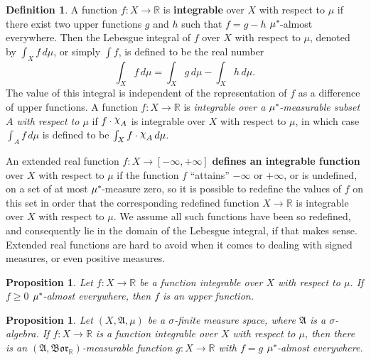 \documentclass[
twoside=true,
paper=letter,
fontsize=11pt,
pagesize=auto,
leqno,
openany,
headsepline,
overfullrule,
]{scrbook}
\theoremstyle{plain}
\theoremstyle{plain}
\newtheorem{prop}[thm]{Proposition}
\theoremstyle{definition}
\newtheorem{defn}[thm]{Definition}
\theoremstyle{bfnoteitalic}
\theoremstyle{bfnoteroman}
\newcommand{\term}[1]{\textbf{#1}\index{#1}}
\newcommand{\sigalg}[1]{\mathfrak{#1}}
\newcommand{\borel}{\mathfrak{Bor}}
\newcommand{\textsigma}{\hbox{\large{$\sigma$}}\kern-1pt}
\newcommand{\charfunction}[1]{{\raisebox{2pt}{$\chi$}}_{#1}}
\newcommand{\R}{\mathbb{R}}
\newcommand{\sigmaalgebra}{\sigalg{A}}
\newcommand{\kernast}{\ast\kern-1pt}
\newcommand{\funcf}{f}
\newcommand{\funcg}{g}
\newcommand{\function}{f}
\newcommand{\measurespace}{X}
\newcommand{\measure}{\mu}
\begin{document}
\begin{defn}\label{integrable}
A function $f:\measurespace\to\R$ is 
\textbf{integrable} over $\measurespace$ with respect to $\measure$
if there exist two upper functions $g$ and $h$ such that $f = g - h$ $\measure^\kernast$-almost everywhere.  Then the Lebesgue integral  of $f$ over $\measurespace$ with respect to $\measure$, denoted by $\int_\measurespace f\, d\measure$, or simply $\int f$, is defined to be the real number
\[
\int_\measurespace f\,d\measure = \int_\measurespace g\, d\measure -\int_\measurespace h \, d \measure.
\]
The value of this integral is independent of the representation of $f$ as a difference of upper functions.
A function $f:\measurespace\to\R$ is 
\emph{integrable over a $\measure^\kernast$-measurable subset $A$ with respect to $\measure$}
if $f\cdot\charfunction{A}$ is integrable over $\measurespace$ with respect to
$\measure$, in which case $\int_A f\, d\measure$ is defined to be $\int_\measurespace f\cdot\charfunction{A}\, d\measure$.

An extended real function $\function:\measurespace\to [-\infty,+\infty]$ 
\term{defines an integrable function} over $\measurespace$
with respect to $\measure$
if the function $\function$ ``attains'' $-\infty$ or $+\infty$, or is undefined, on a set of at most 
$\measure^\kernast$-measure zero, so it is possible to redefine the values of $\function$ on this set in order that the corresponding redefined function 
$\measurespace\to\R$ is integrable over $\measurespace$ with respect to $\measure$.
We assume all such functions have been so redefined, and consequently lie in the domain of the Lebesgue integral, if that makes sense. Extended real functions are hard to avoid when it comes to dealing with signed measures, or even positive measures.
\end{defn}






\begin{prop}\label{integrable_and_positive_is_upper}
Let $f:\measurespace\to\R$ be a function integrable over $\measurespace$ with respect to $\measure$.   If $f\geq 0$ $\measure^\kernast$-almost everywhere, then $f$ is an upper function.
\end{prop}


\begin{prop}\label{sigma_algebra_measurable}
Let $(\measurespace,\sigmaalgebra,\measure)$ be a \textsigma\hyp{}finite measure space, where $\sigmaalgebra$ is a \textsigma\hyp{}algebra.
If $f:\measurespace\to\R$ is a function integrable over $\measurespace$ with respect to $\measure$,
then there is an $(\sigmaalgebra,\borel_\R)$\hyp{}measurable
function $\funcg:\measurespace\to\R$
with $\funcf = \funcg$ $\measure^\kernast$\hyp{}almost everywhere.
\end{prop}
\end{document}
